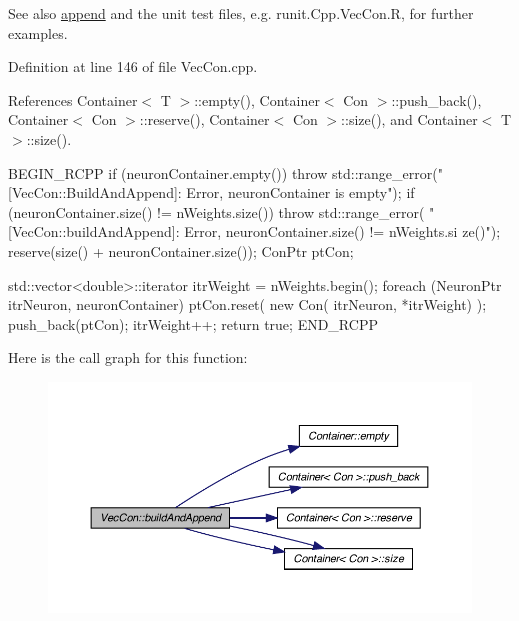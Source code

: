 \begin{DoxySeeAlso}{See also}
\hyperlink{class_container_ae763eb37b721d401327c97016fb2fa54}{append} and the unit test files, e.g. runit.Cpp.VecCon.R, for further examples. 
\end{DoxySeeAlso}


Definition at line 146 of file VecCon.cpp.



References Container$<$ T $>$::empty(), Container$<$ Con $>$::push\_\-back(), Container$<$ Con $>$::reserve(), Container$<$ Con $>$::size(), and Container$<$ T $>$::size().


\begin{DoxyCode}
{
  BEGIN_RCPP
  if (neuronContainer.empty())
    { throw std::range_error("[VecCon::BuildAndAppend]: Error, neuronContainer is
       empty");}
  if (neuronContainer.size() != nWeights.size())
    {
      throw std::range_error(
          "[VecCon::buildAndAppend]: Error, neuronContainer.size() != nWeights.si
      ze()");
    }
  reserve(size() + neuronContainer.size());
  ConPtr ptCon;

  std::vector<double>::iterator itrWeight = nWeights.begin();
  foreach (NeuronPtr itrNeuron, neuronContainer)
    {
      ptCon.reset( new Con( itrNeuron, *itrWeight) );
      push_back(ptCon);
      itrWeight++;
    }
  return true;
END_RCPP}
\end{DoxyCode}


Here is the call graph for this function:
\nopagebreak
\begin{figure}[H]
\begin{center}
\leavevmode
\includegraphics[width=392pt]{class_vec_con_a7234c09d040d7114209137176d384566_cgraph}
\end{center}
\end{figure}


